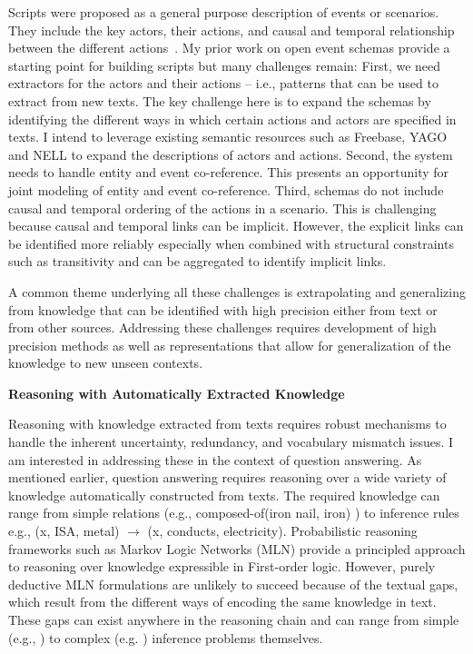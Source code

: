\documentclass[a4paper,11pt,onecolumn]{article}
\begin{document}
Scripts were proposed as a general purpose description of events or scenarios. They include the key actors, their actions, and causal and temporal relationship between the different actions~\cite{schank-scripts75}. My prior work on open event schemas provide a starting point for building scripts but many challenges remain: First, we need extractors for the actors and their actions -- i.e., patterns that can be used to extract from new texts. The key challenge here is to expand the schemas by identifying the different ways in which certain actions and actors are specified in texts. I intend to leverage existing semantic resources such as Freebase, YAGO and NELL to expand the descriptions of actors and actions. Second, the system needs to handle entity and event co-reference. This presents an opportunity for joint modeling of entity and event co-reference. Third, schemas do not include causal and temporal ordering of the actions in a scenario. This is challenging because causal and temporal links can be implicit. However, the explicit links can be identified more reliably especially when combined with structural constraints such as transitivity and can be aggregated to identify implicit links.

A common theme underlying all these challenges is extrapolating and generalizing from knowledge that can be identified with high precision either from text or from other sources.  Addressing these challenges requires development of high precision methods as well as representations that allow for generalization of the knowledge to new unseen contexts. 

{\bf Reasoning with Automatically Extracted Knowledge}

Reasoning with knowledge extracted from texts requires robust mechanisms to handle the inherent uncertainty, redundancy, and vocabulary mismatch issues. I am interested in addressing these in the context of question answering. As mentioned earlier, question answering requires reasoning over a wide variety of knowledge automatically constructed from texts. The required knowledge can range from simple relations (e.g., composed-of(iron nail, iron) ) to inference rules e.g., (x, ISA, metal) $\rightarrow$ (x, conducts, electricity). Probabilistic reasoning frameworks such as Markov Logic Networks (MLN) provide a principled approach to reasoning over knowledge expressible in First-order logic. However, purely deductive MLN formulations are unlikely to succeed because of the textual gaps, which result from the different ways of encoding the same knowledge in text. These gaps can exist anywhere in the reasoning chain and can range from simple (e.g., ) to complex (e.g. ) inference problems themselves. 
\end{document}
